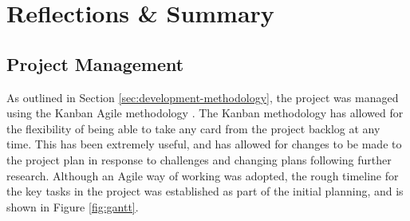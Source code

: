 \chapter{Reflections \& Summary}




\section{Project Management}\label{sec:reflection-on-planning}

As outlined in Section \ref{sec:development-methodology}, the project was managed using the Kanban Agile methodology \cite{stellman2014learning}. The Kanban methodology has allowed for the flexibility of being able to take any card from the project backlog at any time. This has been extremely useful, and has allowed for changes to be made to the project plan in response to challenges and changing plans following further research. Although an Agile way of working was adopted, the rough timeline for the key tasks in the project was established as part of the initial planning, and is shown in Figure \ref{fig:gantt}.

